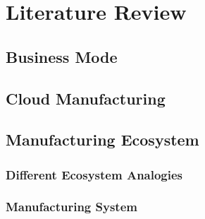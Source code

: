 \section{Literature Review} %
\label{sec:literature_review}

\subsection{Business Mode} %
\label{sub:business_mode}


\subsection{Cloud Manufacturing} %
\label{sub:cloud_manufacturing}


\subsection{Manufacturing Ecosystem} %
\label{sub:manufacturing_ecosystem}

\subsubsection{Different Ecosystem Analogies}

\subsubsection{Manufacturing System}



